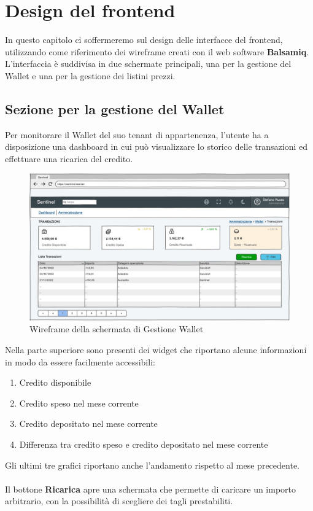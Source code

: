 \chapter{Design del frontend}
In questo capitolo ci soffermeremo sul design delle interfacce del frontend, utilizzando come riferimento dei wireframe creati con il web software \textbf{Balsamiq}.
L'interfaccia \`e suddivisa in due schermate principali, una per la gestione del Wallet e una per la gestione dei listini prezzi.

\section{Sezione per la gestione del Wallet}
Per monitorare il Wallet del suo tenant di appartenenza, l'utente ha a disposizione una dashboard in cui pu\`o visualizzare lo storico delle transazioni ed effettuare una ricarica del credito.

\begin{figure}[H]
  \centering
  \includegraphics[width=12cm]{images/gestione-wallet/mock-gestione-wallet.png}
  \caption{Wireframe della schermata di Gestione Wallet}
\end{figure}

Nella parte superiore sono presenti dei widget che riportano alcune informazioni in modo da essere facilmente accessibili:
\begin{enumerate}
  \item Credito disponibile
  \item Credito speso  nel mese corrente
  \item Credito depositato nel mese corrente
  \item Differenza tra credito speso e credito depositato nel mese corrente
\end{enumerate}
Gli ultimi tre grafici riportano anche l'andamento rispetto al mese precedente.
\\\\
Il bottone \textbf{Ricarica} apre una schermata che permette di caricare un importo arbitrario, con la possibilit\`a di scegliere
dei tagli prestabiliti.

